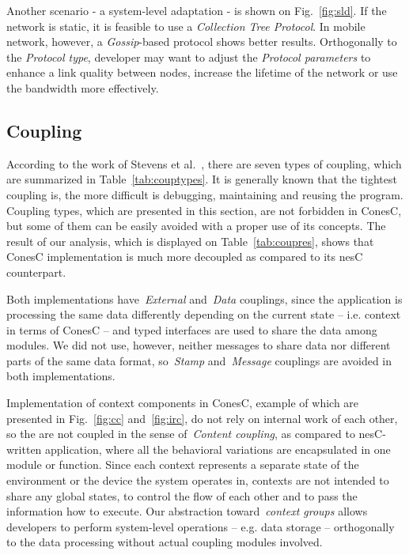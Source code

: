 Another scenario - a system-level adaptation - is shown on Fig.~\ref{fig:sld}.
If the network is static, it is feasible to use a \emph{Collection Tree
Protocol}. In mobile network, however, a \emph{Gossip}-based protocol shows
better results. Orthogonally to the \emph{Protocol type}, developer may want to
adjust the \emph{Protocol parameters} to enhance a link quality between nodes,
increase the lifetime of the network or use the bandwidth more effectively.


\subsection{Coupling}\label{sec:evalcomp}

According to the work of Stevens et al.~\cite{stevens79}, there are seven types
of coupling, which are summarized in Table~\ref{tab:couptypes}. It is generally
known that the tightest coupling is, the more difficult is debugging,
maintaining and reusing the program. Coupling types, which are presented in this section, are not forbidden in ConesC, but some of them can be easily avoided with a proper use of its concepts. The result of our analysis, which is displayed on Table~\ref{tab:coupres}, shows that ConesC
implementation is much more decoupled as compared to its nesC counterpart. 

Both implementations have~\emph{External} and~\emph{Data} couplings, since the application is processing the same data differently depending on the current state -- i.e. context in terms of ConesC -- and typed interfaces are used to share the data among modules. We did not use, however, neither messages to share data nor different parts of the same data format, so~\emph{Stamp} and~\emph{Message} couplings are avoided in both implementations.

Implementation of context components in ConesC, example of which are presented in Fig.~\ref{fig:cc} and~\ref{fig:irc}, do not rely on internal work of each other, so the are not coupled in the sense of~\emph{Content coupling}, as compared to nesC-written application, where all the behavioral variations are encapsulated in one module or function. Since each context represents a separate state of the environment or the device the system operates in, contexts are not intended to share any global states, to control the flow of each other and to pass the information how to execute. Our abstraction toward~\emph{context
groups} allows developers to perform system-level operations -- e.g. data storage --
orthogonally to the data processing without actual coupling modules involved.

